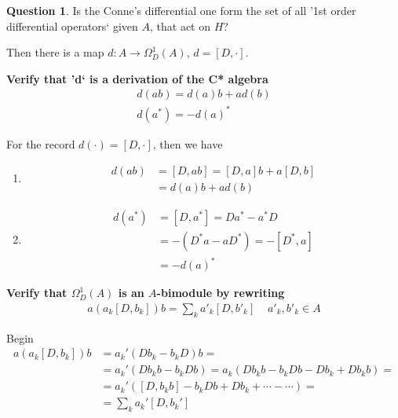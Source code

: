 \documentclass[a4paper]{article}
\newcounter{exercise}
\newenvironment{MyExercise}%
{\begin{mdframed}[style=exercisestyle]}{\end{mdframed}}
\theoremstyle{definition}
\theoremstyle{definition}
\newtheorem{question}{Question}
\theoremstyle{definition}
\theoremstyle{theorem}
\theoremstyle{theorem}
\begin{document}
\begin{question}
    Is the Conne's differential one form  the set of all '1st order
    differential operators` given $A$, that act on $H$?
\end{question}
Then there is a map $d:A\rightarrow \Omega _D ^1 (A)$, $d = [D, \cdot]$.
\begin{MyExercise}
    \textbf{
    Verify that 'd` is a derivation of the C* algebra
    \begin{align*}
        d(ab) = d(a)b + ad(b) \\
        d(a^*) = -d(a)^*
    \end{align*}
}\newline

    For the record $d(\cdot) = [D, \cdot]$, then we have
    \begin{enumerate}
        \item
            \begin{align*}
                d(ab) &= [D, ab] = [D, a]b + a[D,b]\\
                &= d(a)b + ad(b)
            \end{align*}
        \item
            \begin{align*}
                d(a^*) &= [D, a^*] = Da^* - a^*D \\
                &=-(D^*a - aD^*) = -[D^*, a] \\
                &= -d(a)^*
            \end{align*}
    \end{enumerate}
\end{MyExercise}
\begin{MyExercise}
    \textbf{
    Verify that $\Omega _D^1 (A)$ is an $A$-bimodule by rewriting
    }
    \begin{align*}
        a(a_k[D, b_k])b = \sum_k a'_k[D, b'_k] \;\;\;\; a'_k, b'_k \in A
    \end{align*}
    \newline

    Begin
    \begin{align*}
        a(a_k[D, b_k])b &= a_k'(Db_k - b_k D) b = \\
           &= a_k'(Db_k b - b_k D b) = a_k(Db_k b - b_k Db -Db_k +Db_kb)=\\
           &= a_k'([D, b_kb] - b_k D b + D b_k  + \cdots - \cdots) = \\
           &=\sum_k a_k' [D, b_k']
    \end{align*}

\end{MyExercise}
\end{document}
